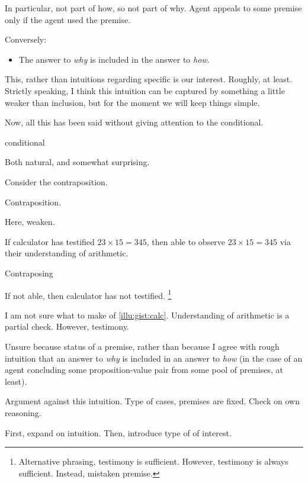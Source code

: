 \begin{note}
  In particular, not part of how, so not part of why.
  Agent appeals to some premise only if the agent used the premise.

  Conversely:
  \begin{itemize}
  \item
    The answer to \emph{why} is included in the answer to \emph{how}.
  \end{itemize}

  This, rather than intuitions regarding specific  is our interest.
  Roughly, at least.
  Strictly speaking, I think this intuition can be captured by something a little weaker than inclusion, but for the moment we will keep things simple.
\end{note}

\begin{note}
  Now, all this has been said without giving attention to the conditional.

  \begin{center}
    conditional
  \end{center}

  Both natural, and somewhat surprising.

  Consider the contraposition.

  \begin{center}
    Contraposition.
  \end{center}

  Here, weaken.

  If calculator has testified \(23 \times 15 = 345\), then able to observe \(23 \times 15 = 345\) via their understanding of arithmetic.

  Contraposing

  If not able, then calculator has not testified.%
  \footnote{
    Alternative phrasing, testimony is sufficient.
    However, testimony is always sufficient.
    Instead, mistaken premise.
  }
\end{note}

\begin{note}
  I am not sure what to make of \ref{illu:gist:calc}.
  Understanding of arithmetic is a partial check.
  However, testimony.

  Unsure because status of a premise, rather than because I agree with rough intuition that an answer to \emph{why} is included in an answer to \emph{how} (in the case of an agent concluding some proposition-value pair from some pool of premises, at least).

  Argument against this intuition.
  Type of cases, premises are fixed.
  Check on own reasoning.

  First, expand on intuition.
  Then, introduce type of  of interest.
\end{note}

